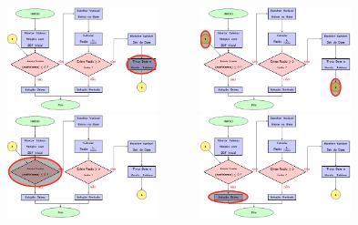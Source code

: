 \begin{frame}
\begin{columns}
\begin{column}{0.5\textwidth}
{			}
			\only<15-16>
			{
				\includegraphics[width=5.5cm,height=3cm]{Alg_7.png}
			}
			\only<17>
			{
				\includegraphics[width=5.5cm,height=3cm]{Alg_9.png}
			}
			\only<18>
			{
				\includegraphics[width=5.5cm,height=3cm]{Alg_2.png}
			}
			\only<19-20>
			{
				\includegraphics[width=5.5cm,height=3cm]{Alg_8.png}
			}
		\end{column}
	\end{columns}
\end{frame}


